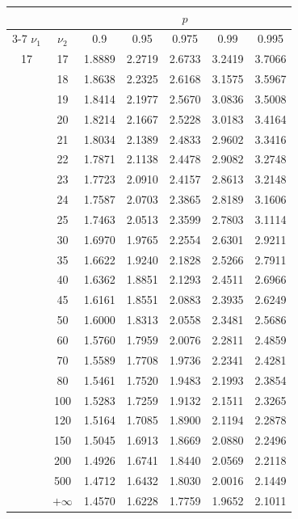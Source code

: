 \hfill
\begin{minipage}{0.49\textwidth}
	\begin{center}
		\begin{tabular}{ccccccc}
			& & \multicolumn{5}{c}{$p$}\\
			\cline{3-7}
			$\nu_1$ & $\nu_2$ & 0.9 & 0.95 & 0.975 & 0.99 & 0.995 \\
			\midrule
			17 & 17 & 1.8889 & 2.2719 & 2.6733 & 3.2419 & 3.7066 \\
			& 18 & 1.8638 & 2.2325 & 2.6168 & 3.1575 & 3.5967 \\
			& 19 & 1.8414 & 2.1977 & 2.5670 & 3.0836 & 3.5008 \\[5pt]
			& 20 & 1.8214 & 2.1667 & 2.5228 & 3.0183 & 3.4164 \\
			& 21 & 1.8034 & 2.1389 & 2.4833 & 2.9602 & 3.3416 \\
			& 22 & 1.7871 & 2.1138 & 2.4478 & 2.9082 & 3.2748 \\
			& 23 & 1.7723 & 2.0910 & 2.4157 & 2.8613 & 3.2148 \\
			& 24 & 1.7587 & 2.0703 & 2.3865 & 2.8189 & 3.1606 \\
			& 25 & 1.7463 & 2.0513 & 2.3599 & 2.7803 & 3.1114 \\
			& 30 & 1.6970 & 1.9765 & 2.2554 & 2.6301 & 2.9211 \\
			& 35 & 1.6622 & 1.9240 & 2.1828 & 2.5266 & 2.7911 \\
			& 40 & 1.6362 & 1.8851 & 2.1293 & 2.4511 & 2.6966 \\
			& 45 & 1.6161 & 1.8551 & 2.0883 & 2.3935 & 2.6249 \\[5pt]
			& 50 & 1.6000 & 1.8313 & 2.0558 & 2.3481 & 2.5686 \\
			& 60 & 1.5760 & 1.7959 & 2.0076 & 2.2811 & 2.4859 \\
			& 70 & 1.5589 & 1.7708 & 1.9736 & 2.2341 & 2.4281 \\
			& 80 & 1.5461 & 1.7520 & 1.9483 & 2.1993 & 2.3854 \\
			& 100 & 1.5283 & 1.7259 & 1.9132 & 2.1511 & 2.3265 \\
			& 120 & 1.5164 & 1.7085 & 1.8900 & 2.1194 & 2.2878 \\
			& 150 & 1.5045 & 1.6913 & 1.8669 & 2.0880 & 2.2496 \\
			& 200 & 1.4926 & 1.6741 & 1.8440 & 2.0569 & 2.2118 \\
			& 500 & 1.4712 & 1.6432 & 1.8030 & 2.0016 & 2.1449 \\
			& $+\infty$ & 1.4570 & 1.6228 & 1.7759 & 1.9652 & 2.1011 \\

\end{tabular}
\end{center}
\end{minipage}
